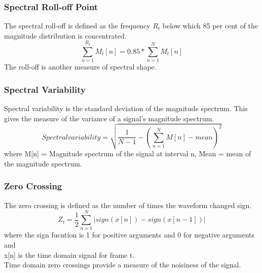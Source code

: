 \subsubsection{Spectral Roll-off Point}
The spectral roll-off is defined as the frequency $R_t$ below which 85 per cent of the magnitude distribution is concentrated.
\begin{equation}
        \sum_{n=1}^{R_t}M_t[n] = 0.85*\sum_{n=1}^{N}{M_t[n]}
\end{equation}
The roll-off is another measure of spectral shape.

\subsubsection{Spectral Variability}
  Spectral variability is the standard deviation of the magnitude spectrum. This gives the 
  measure of the variance of a signal's magnitude spectrum. 
  \begin{equation}
          Spectral variability = \sqrt{\frac{1}{N-1}-(\sum_{n=1}^{N}{M[n]-mean})^2}
  \end{equation}
  where M[n] = Magnitude spectrum of the signal at interval n,
  Mean = mean of the magnitude spectrum.

  \subsubsection{Zero Crossing}
The zero crossing is defined as the number of times the waveform changed sign.
\begin{equation}
        Z_t = \frac{1}{2}\sum_{n=1}^{N}{|sign(x[n])-sign(x[n-1])|}
\end{equation}
where the sign fucntion is 1 for positive arguments and 0 for negative arguments and\\
x[n] is the time domain signal for frame t.\\
Time domain zero crossings provide a measure of the noisiness of the signal.



